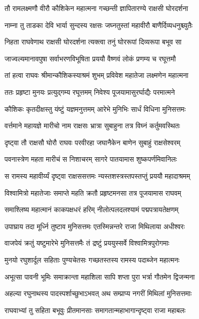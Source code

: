 \twolineshloka
{तौ रामलक्ष्मणौ वीरौ कौशिकेन महात्मना}
{गच्छन्ती ज्ञापितारण्ये राक्षसी घोरदर्शना}%

\twolineshloka
{नाम्ना तु ताडका देवि भार्या सुन्दस्य रक्षसः}
{जघ्नतुस्तां महावीरौ बाणैर्दिव्यधनुश्च्युतैः}%

\twolineshloka
{निहता राघवेणाथ राक्षसी घोरदर्शना}
{त्यक्त्वा तनुं घोररूपां दिव्यरूपा बभूव सा}%

\twolineshloka
{जाज्वल्यमानावपुषा सर्वाभरणविभूषिता}
{प्रययौ वैष्णवं लोकं प्रणम्य च रघूत्तमौ}%

\twolineshloka
{तां हत्वा राघवः श्रीमान्कौशिकस्याश्रमं शुभम्}
{प्रविवेश महातेजा लक्ष्मणेन महात्मना}%

\twolineshloka
{ततः प्रहृष्टा मुनयः प्रत्युद्गम्य रघूत्तमम्}
{निवेश्य पूजयामासुरर्घाद्यैः परमात्मने}%

\twolineshloka
{कौशिकः कृतदीक्षस्तु यंष्टुं यज्ञमनुत्तमम्}
{आरेभे मुनिभिः सार्धं विधिना मुनिसत्तमः}%

\twolineshloka
{वर्त्तमाने महायज्ञे मारीचो नाम राक्षसः}
{भ्रात्रा सुबाहुना तत्र विघ्नं कर्तुमवस्थितः}%

\twolineshloka
{दृष्ट्वा तौ राक्षसौ घोरौ राघवः परवीरहा}
{जघानैकेन बाणेन सुबाहुं राक्षसेश्वरम्}%

\twolineshloka
{पवनास्त्रेण महता मारीचं स निशाचरम्}
{सागरे पातयामास शुष्कपर्णमिवानिलः}%

\twolineshloka
{स रामस्य महावीर्य्यं दृष्ट्वा राक्षससत्तमः}
{न्यस्तशस्त्रस्तपस्तप्तुं प्रययौ महादाश्रमम्}%

\twolineshloka
{विश्वामित्रो महातेजाः समाप्ते महति क्रतौ}
{प्रहृष्टमनसा तत्र पूजयामास राघवम्}%

\twolineshloka
{समाश्लिष्य महात्मानं काकपक्षधरं हरिम्}
{नीलोत्पलदलश्यामं पद्मपत्रायतेक्षणम्}%

\twolineshloka
{उपाघ्राय तदा मूर्ध्नि तुष्टाव मुनिसत्तमः}
{एतस्मिन्नन्तरे राजा मिथिलाया अधीश्वरः}%

\twolineshloka
{वाजपेयं क्रतुं यष्टुमारेभे मुनिसत्तमैः}
{तं द्रष्टुं प्रययुस्सर्वे विश्वामित्रपुरोगमाः}%

\twolineshloka
{मुनयो रघुशार्दूल सहिताः पुण्यचेतसः}
{गच्छतस्तस्य रामस्य पदाब्जेन महात्मनः}%

\twolineshloka
{अभूत्सा पावनी भूमिः समाक्रान्ता महाशिला}
{सापि शप्ता पुरा भर्त्रा गौतमेन द्विजन्मना}%

\twolineshloka
{अहल्या रघुनाथस्य पादस्पर्शाच्छुभाऽभवत्}
{अथ सम्प्राप्य नगरीं मिथिलां मुनिसत्तमाः}%

\twolineshloka
{राघवाभ्यां तु सहिता बभूवुः प्रीतमानसाः}
{समागतान्महाभागान्दृष्ट्वा राजा महाबलः}%

